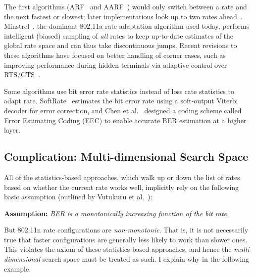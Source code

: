 The first algorithms (ARF~\cite{Kamerman_ARF} and AARF~\cite{Lacage_AARF}) would only switch between a rate and the next fastest or slowest; later implementations look up to two rates ahead~\cite{Bicket_SampleRate}. Minstrel~\cite{minstrel}, the dominant 802.11a rate adaptation algorithm used today, performs intelligent (biased) sampling of \emph{all} rates to keep up-to-date estimates of the global rate space and can thus take discontinuous jumps. Recent revisions to these algorithms have focused on better handling of corner cases, such as improving performance during hidden terminals via adaptive control over RTS/CTS~\cite{minstrel,Wong_RRAA}.

Some algorithms use bit error rate statistics instead of loss rate statistics to adapt rate. SoftRate~\cite{Vutukuru_SoftRate} estimates the bit error rate using a soft-output Viterbi decoder for error correction, and Chen et al.~\cite{Chen_EEC} designed a coding scheme called Error Estimating Coding (EEC) to enable accurate BER estimation at a higher layer.

\subsection{Complication: Multi-dimensional Search Space} 
All of the statistics-based approaches, which walk up or down the list of rates based on whether the current rate works well, implicitly rely on the following basic assumption (outlined by Vutukuru et al.~\cite{Vutukuru_SoftRate}):
\begin{center}
\textbf{Assumption:} \emph{BER is a monotonically increasing function of the bit rate.}
\end{center}
But 802.11n rate configurations are \emph{non-monotonic}. That is, it is not necessarily true that faster configurations are generally less likely to work than slower ones. This violates the axiom of these statistics-based approaches, and hence the \emph{multi-dimensional} search space must be treated as such. I explain why in the following example.

